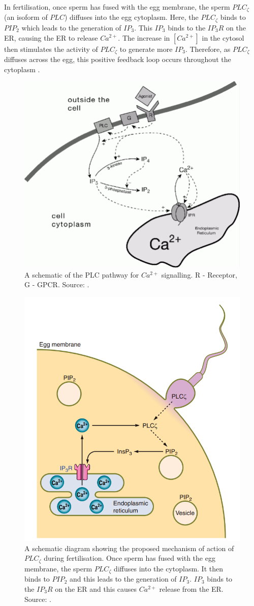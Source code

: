 {In fertilisation, once sperm has fused with the egg membrane, the sperm $PLC_{\zeta}$ {(an isoform of $PLC$)} diffuses into the egg cytoplasm. Here, the $PLC_{\zeta}$ binds to $PIP_2$ which leads to the generation of $IP_3$. This $IP_3$ binds to the $IP_3R$ on the ER, causing the ER to release $Ca^{2+}$. The increase in $[Ca^{2+}]$ in the cytosol then stimulates the activity of $PLC_{\zeta}$ to generate more $IP_3$. Therefore, as $PLC_{\zeta}$ diffuses across the egg, this positive feedback loop occurs throughout the cytoplasm \cite{swannlai}.

\begin{figure}[h!!!t!!!b!!!p]
  \centering
  \includegraphics[width=0.7\linewidth]{Chapters/1_Introduction/extras/toolbox.png}
  \caption{A schematic of the PLC pathway for $Ca^{2+}$ signalling. R - Receptor, G - GPCR. Source: .}\label{sneydcatoolbox}
\end{figure}

\begin{figure}[h!!!t!!!b!!!p]
  \centering
  \includegraphics[width=0.6\linewidth]{Chapters/1_Introduction/extras/karlfig6.png}
  \caption{A schematic diagram showing the proposed mechanism of action of $PLC_{\zeta}$ during fertilisation. Once sperm has fused with the egg membrane, the sperm $PLC_{\zeta}$ diffuses into the cytoplasm. It then binds to $PIP_2$ and this leads to the generation of $IP_3$. $IP_3$ binds to the $IP_3R$ on the ER and this causes $Ca^{2+}$ release from the ER. Source: . }\label{sneydcatoolbox}
\end{figure}

}
